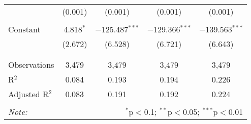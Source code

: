 \begin{table}[!htbp]
\begin{tabular}{@{\extracolsep{-5pt}}lcccc}
  & (0.001) & (0.001) & (0.001) & (0.001) \\ 
  & & & & \\ 
 Constant & 4.818$^{*}$ & $-$125.487$^{***}$ & $-$129.366$^{***}$ & $-$139.563$^{***}$ \\ 
  & (2.672) & (6.528) & (6.721) & (6.643) \\ 
  & & & & \\ 
\hline \\[-1.8ex] 
Observations & 3,479 & 3,479 & 3,479 & 3,479 \\ 
R$^{2}$ & 0.084 & 0.193 & 0.194 & 0.226 \\ 
Adjusted R$^{2}$ & 0.083 & 0.191 & 0.192 & 0.224 \\ 
\hline 
\hline \\[-1.8ex] 
\textit{Note:}  & \multicolumn{4}{r}{$^{*}$p$<$0.1; $^{**}$p$<$0.05; $^{***}$p$<$0.01} \\ 
\end{tabular} 
\end{table} 
